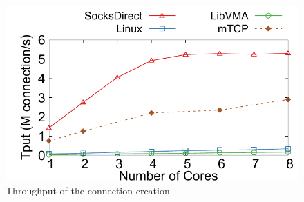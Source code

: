 \begin{figure}[htpb]
	\centering
	\includegraphics[width=\columnwidth]{eval/microbenchmark/conn-setup-tput.pdf}
	\caption{Throughput of the connection creation}
	\label{fig:eval-conn-setup-tput}
\end{figure}


